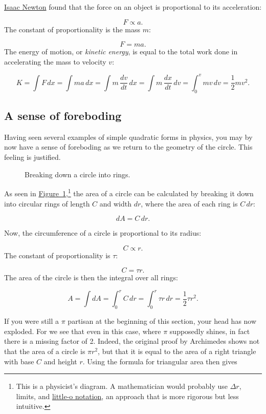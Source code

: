 \documentclass{article}
\begin{document}
\href{http://en.wikipedia.org/wiki/Isaac_Newton}{Isaac Newton} found that the force on an object is proportional to its acceleration:

\[ F \propto a. \]
The constant of proportionality is the mass $m$:

\[ F = m a. \]
The energy of motion, or \emph{kinetic energy}, is equal to the total work done in accelerating the mass to velocity $v$:

\[ K = \int F\,dx = \int ma\,dx = \int m\,\frac{dv}{dt}\,dx = \int m\, \frac{dx}{dt}\,dv = \int_0^v mv\,dv = \textstyle{\frac{1}{2}} mv^2. \]

  \subsection{A sense of foreboding} %
  \label{sec:a_sense_of_foreboding}

Having seen several examples of simple quadratic forms in physics, you may by now have a sense of foreboding as we return to the geometry of the circle. This feeling is justified.

\begin{figure}
\begin{center}
\end{center}
\caption{Breaking down a circle into rings.\label{fig:circular_area}}
\end{figure}


As seen in \hyperref[fig:circular_area]{Figure~}\ref{fig:circular_area},\footnote{This is a physicist's diagram. A mathematician would probably use $\Delta r$, limits, and \href{http://en.wikipedia.org/wiki/Big_O_notation\#Little-o_notation}{little-o notation}, an approach that is more rigorous but less intuitive.} the area of a circle can be calculated by breaking it down into circular rings of length $C$ and width $dr$, where the area of each ring is $C\,dr$:

\[ dA = C\,dr. \]


\noindent Now, the circumference of a circle is proportional to its radius:

\[ C \propto r. \]
The constant of proportionality is $\tau$:

\[ C = \tau r. \]
The area of the circle is then the integral over all rings:

\[ A = \int dA = \int_0^r C\,dr = \int_0^r \tau r\,dr = \textstyle{\frac{1}{2}} \tau r^2. \]

If you were still a $\pi$ partisan at the beginning of this section, your head has now exploded. For we see that even in this case, where $\pi$ supposedly shines, in fact there is a missing factor of 2. Indeed, the original proof by Archimedes shows not that the area  of a circle is $\pi r^2$, but that it is equal to the area of a right triangle with base $C$ and height $r$. Using the formula for triangular area then gives
\end{document}
